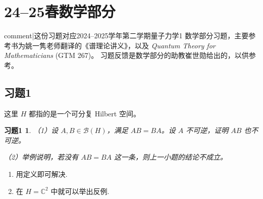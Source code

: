 \theoremstyle{plain}\newtheorem*{1}{习题1}
\theoremstyle{plain}\newtheorem*{2}{习题2}
\theoremstyle{plain}\newtheorem*{3}{习题3}
\theoremstyle{plain}\newtheorem*{4}{习题4}
\theoremstyle{plain}\newtheorem*{5}{习题5}
\theoremstyle{plain}\newtheorem*{6}{习题6}
\theoremstyle{plain}\newtheorem*{7}{习题7}
\theoremstyle{plain}\newtheorem*{8}{习题8}
\theoremstyle{plain}\newtheorem*{9}{习题9}
\theoremstyle{plain}\newtheorem*{10}{习题10}

\section{24--25春\quad 数学部分}
{{comment|这份习题对应2024--2025学年第二学期量子力学1
数学部分习题，主要参考书为姚一隽老师翻译的《谱理论讲义》，以及
\textit{Quantum Theory for Mathematicians} (GTM 267)。
习题反馈是数学部分的助教崔世勋给出的，以供参考。}}

\subsection*{习题1}

这里 $H$ 都指的是一个可分复 Hilbert 空间。
\begin{1}
（1）设 $A, B \in \mathcal{B}(H)$，满足 $AB=BA$。设 $A$ 不可逆，证明 $AB$ 也不可逆。

（2）举例说明，若没有 $AB=BA$ 这一条，则上一小题的结论不成立。
\end{1}
\begin{enumerate}
    \item[(1)] 用定义即可解决.
    \item[(2)] 在 $H=\mathbb{C}^2$ 中就可以举出反例.
\end{enumerate}


